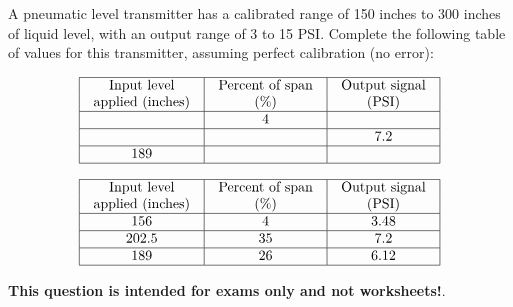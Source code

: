 

A pneumatic level transmitter has a calibrated range of 150 inches to 300 inches of liquid level, with an output range of 3 to 15 PSI.  Complete the following table of values for this transmitter, assuming perfect calibration (no error):


$$\vbox{\offinterlineskip
\halign{\strut
\vrule \quad\hfil # \ \hfil & 
\vrule \quad\hfil # \ \hfil & 
\vrule \quad\hfil # \ \hfil \vrule \cr
\noalign{\hrule}
%
Input level & Percent of span & Output signal \cr
%
applied (inches) & (\%) & (PSI) \cr
%
\noalign{\hrule}
%
 & 4 &  \cr
%
\noalign{\hrule}
%
 &  & 7.2 \cr
%
\noalign{\hrule}
%
189 &  &  \cr
%
\noalign{\hrule}
} %
}$$ %









$$\vbox{\offinterlineskip
\halign{\strut
\vrule \quad\hfil # \ \hfil & 
\vrule \quad\hfil # \ \hfil & 
\vrule \quad\hfil # \ \hfil \vrule \cr
\noalign{\hrule}
%
Input level & Percent of span & Output signal \cr
%
applied (inches) & (\%) & (PSI) \cr
%
\noalign{\hrule}
%
156 & 4 & 3.48 \cr
%
\noalign{\hrule}
%
202.5 & 35 & 7.2 \cr
%
\noalign{\hrule}
%
189 & 26 & 6.12 \cr
%
\noalign{\hrule}
} %
}$$ %







{\bf This question is intended for exams only and not worksheets!}.



